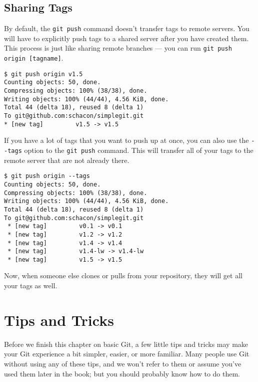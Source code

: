 \documentclass[a4paper]{book}
\begin{document}
\subsection{Sharing Tags}\label{sharing-tags}

By default, the \texttt{git push} command doesn't transfer tags to remote servers. You will have to explicitly push tags to a shared server after you have created them. This process is just like sharing remote branches --- you can run \texttt{git push origin {[}tagname{]}}.

\begin{shaded}\begin{verbatim}
$ git push origin v1.5
Counting objects: 50, done.
Compressing objects: 100% (38/38), done.
Writing objects: 100% (44/44), 4.56 KiB, done.
Total 44 (delta 18), reused 8 (delta 1)
To git@github.com:schacon/simplegit.git
* [new tag]         v1.5 -> v1.5
\end{verbatim}\end{shaded}

If you have a lot of tags that you want to push up at once, you can also use the \texttt{-{}-tags} option to the \texttt{git push} command. This will transfer all of your tags to the remote server that are not already there.

\begin{shaded}\begin{verbatim}
$ git push origin --tags
Counting objects: 50, done.
Compressing objects: 100% (38/38), done.
Writing objects: 100% (44/44), 4.56 KiB, done.
Total 44 (delta 18), reused 8 (delta 1)
To git@github.com:schacon/simplegit.git
 * [new tag]         v0.1 -> v0.1
 * [new tag]         v1.2 -> v1.2
 * [new tag]         v1.4 -> v1.4
 * [new tag]         v1.4-lw -> v1.4-lw
 * [new tag]         v1.5 -> v1.5
\end{verbatim}\end{shaded}

Now, when someone else clones or pulls from your repository, they will get all your tags as well.

\section{Tips and Tricks}\label{tips-and-tricks}

Before we finish this chapter on basic Git, a few little tips and tricks may make your Git experience a bit simpler, easier, or more familiar. Many people use Git without using any of these tips, and we won't refer to them or assume you've used them later in the book; but you should probably know how to do them.
\end{document}
